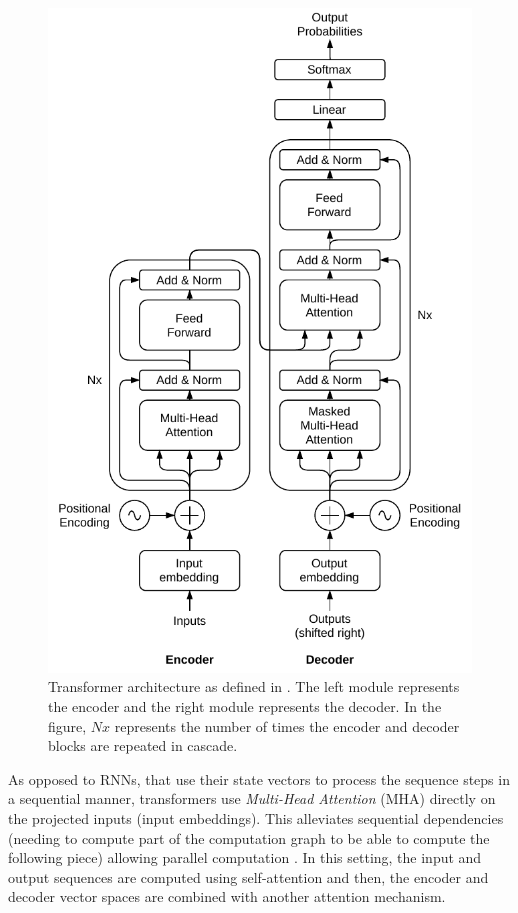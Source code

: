 \begin{figure}
	\centering
	\includegraphics[width=0.8\linewidth]{chapter2/images/transformer}
	\caption{Transformer architecture as defined in \autocite{vaswani2017}. The left module represents the encoder and the right module represents the decoder. In the figure, $Nx$ represents the number of times the encoder and decoder blocks are repeated in cascade.}
	\label{fig:transformer}
\end{figure}

As opposed to RNNs, that use their state vectors to process the sequence steps in a sequential manner, transformers use \textit{Multi-Head Attention} (MHA) directly on the projected inputs (input embeddings). This alleviates sequential dependencies (needing to compute part of the computation graph to be able to compute the following piece) allowing parallel computation \autocite{uday2019}. In this setting, the input and output sequences are computed using self-attention and then, the encoder and decoder vector spaces are combined with another attention mechanism.

